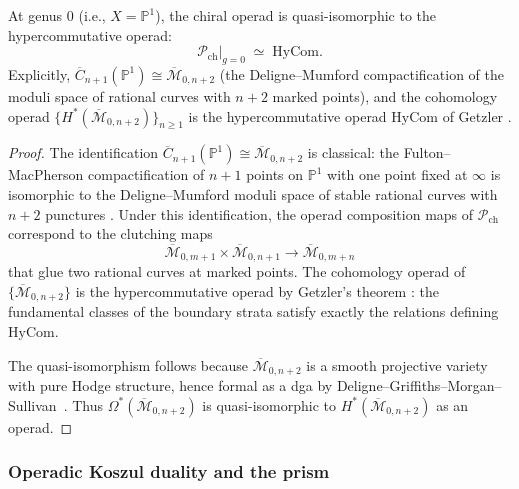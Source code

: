 \begin{proposition}%
\label{prop:chiral-operad-genus0}
At genus $0$ (i.e., $X = \mathbb{P}^1$), the chiral operad is
quasi-isomorphic to the hypercommutative operad:
\[
\mathcal{P}_{\mathrm{ch}}|_{g=0} \;\simeq\; \mathrm{HyCom}.
\]
Explicitly, $\overline{C}_{n+1}(\mathbb{P}^1) \cong
\overline{\mathcal{M}}_{0,n+2}$ (the Deligne--Mumford compactification
of the moduli space of rational curves with $n+2$ marked points), and
the cohomology operad
$\{H^*(\overline{\mathcal{M}}_{0,n+2})\}_{n \geq 1}$ is the
hypercommutative operad $\mathrm{HyCom}$ of Getzler \cite{Get95}.
\end{proposition}

\begin{proof}
The identification
$\overline{C}_{n+1}(\mathbb{P}^1) \cong \overline{\mathcal{M}}_{0,n+2}$
is classical: the Fulton--MacPherson compactification of $n+1$ points on
$\mathbb{P}^1$ with one point fixed at $\infty$ is isomorphic to the
Deligne--Mumford moduli space of stable rational curves with $n+2$
punctures \cite{FM94}.  Under this identification, the operad composition
maps of $\mathcal{P}_{\mathrm{ch}}$ correspond to the clutching maps
\[
\overline{\mathcal{M}}_{0,m+1} \times
\overline{\mathcal{M}}_{0,n+1} \to
\overline{\mathcal{M}}_{0,m+n}
\]
that glue two rational curves at marked points.  The cohomology operad
of $\{\overline{\mathcal{M}}_{0,n+2}\}$ is the hypercommutative operad
by Getzler's theorem \cite[Theorem~1.5]{Get95}: the fundamental classes
of the boundary strata satisfy exactly the relations defining
$\mathrm{HyCom}$.

The quasi-isomorphism follows because
$\overline{\mathcal{M}}_{0,n+2}$ is a smooth projective variety
with pure Hodge structure, hence formal as a dga by
Deligne--Griffiths--Morgan--Sullivan~\cite{DGMS75}.  Thus
$\Omega^*(\overline{\mathcal{M}}_{0,n+2})$ is quasi-isomorphic
to $H^*(\overline{\mathcal{M}}_{0,n+2})$ as an operad.
\end{proof}

\subsubsection{Operadic Koszul duality and the prism}

